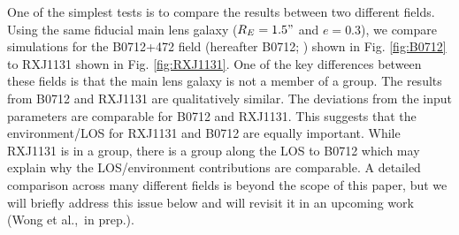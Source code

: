 One of the simplest tests is to compare the results between two different fields. Using the same fiducial main lens galaxy ($R_E = 1.5"$ and $e=0.3$), we compare simulations for the B0712+472 field (hereafter B0712; \citealt{Jackson98}) shown in Fig. \ref{fig:B0712} to RXJ1131 shown in Fig. \ref{fig:RXJ1131}. One of the key differences between these fields is that the main lens galaxy is not a member of a group. The results from B0712 and RXJ1131 are qualitatively similar. The deviations from the input parameters are comparable for B0712 and RXJ1131. This suggests that the environment/LOS for RXJ1131 and B0712 are equally important. While RXJ1131 is in a group, there is a group along the LOS to B0712 which may explain why the LOS/environment contributions are comparable. A detailed comparison across many different fields is beyond the scope of this paper, but we will briefly address this issue below and will revisit it in an upcoming work (Wong et al.,~in prep.).
  